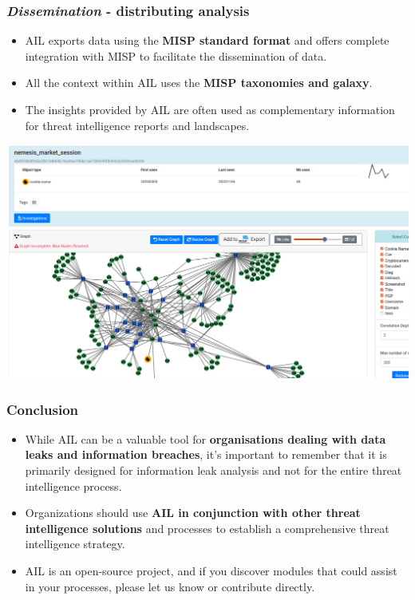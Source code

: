 \documentclass{beamer}
\begin{document}
\begin{frame}
    \frametitle{{\it Dissemination} - distributing analysis}
\begin{itemize}
    \item AIL exports data using the {\bf MISP standard format} and offers complete integration with MISP to facilitate the dissemination of data.
    \item All the context within AIL uses the {\bf MISP taxonomies and galaxy}.
    \item The insights provided by AIL are often used as complementary information for threat intelligence reports and landscapes.
\end{itemize}
    \begin{center}
      \includegraphics[scale=0.15]{images/ail-cookie.png}
    \end{center}
\end{frame}

\begin{frame}
    \frametitle{Conclusion}
\begin{itemize}
    \item While AIL can be a valuable tool for {\bf organisations dealing with data leaks and information breaches}, it's important to remember that it is primarily designed for information leak analysis and not for the entire threat intelligence process.
    \item Organizations should use \textbf{AIL in conjunction with other threat intelligence solutions} and processes to establish a comprehensive threat intelligence strategy.
    \item AIL is an open-source project, and if you discover modules that could assist in your processes, please let us know or contribute directly.
\end{itemize}
\end{frame}
\end{document}
